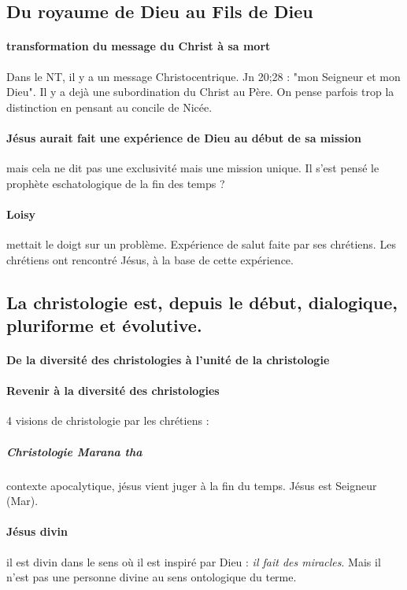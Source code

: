 \subsection{Du royaume de Dieu au Fils de Dieu}

 \paragraph{transformation du message du Christ à sa mort}
Dans le NT, il y a un message Christocentrique. Jn 20;28 : "mon Seigneur et mon Dieu". Il y a dejà une subordination du Christ au Père. On pense parfois trop la distinction en pensant au concile de Nicée. 

\paragraph{Jésus aurait fait une expérience de Dieu au début de sa mission} mais cela ne dit pas une exclusivité mais une mission unique. Il s'est pensé le prophète eschatologique de la fin des temps ?  

\paragraph{Loisy} mettait le doigt sur un problème. Expérience de salut faite par ses chrétiens. Les chrétiens ont rencontré Jésus, à la base de cette expérience. 

\subsection{La christologie est, depuis le début, dialogique, pluriforme et évolutive.}




 \paragraph{De la diversité des christologies à l’unité de la christologie}
 \paragraph{Revenir à la diversité des christologies}
4 visions de christologie par les chrétiens :

\subparagraph{Christologie Marana tha} contexte apocalytique, jésus vient juger à la fin du temps. Jésus est Seigneur (Mar).
\paragraph{Jésus divin} il est divin dans le sens où il est inspiré par Dieu : \textit{il fait des miracles}. Mais il n'est pas une personne divine au sens ontologique du terme.

